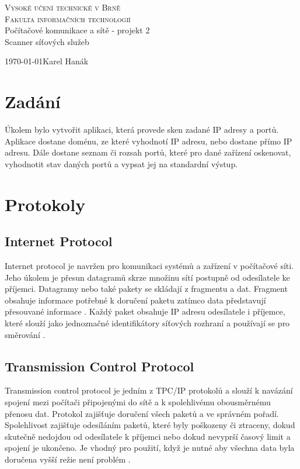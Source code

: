 \documentclass[a4paper, 11pt]{article}
\begin{document}
	\begin{titlepage}
		\begin{center}
			{\Huge \textsc{Vysoké učení technické v Brně\\[0,3em]{\huge Fakulta informačních technologií}}}\\
			{{\Huge Počítačové komunikace a sítě - projekt 2}\\[0,4em]{\Huge Scanner síťových služeb}}\\
		\end{center}
		{\Large \today \hfill Karel Hanák}
	\end{titlepage}
	
	\tableofcontents
	\newpage

\section{Zadání}
Úkolem bylo vytvořit aplikaci, která provede sken zadané IP adresy a portů. Aplikace dostane doménu, ze které vyhodnotí IP adresu, nebo dostane přímo IP adresu. Dále dostane seznam či rozsah portů, které pro dané zařízení oskenovat, vyhodnotit stav daných portů a vypsat jej na standardní výstup.

\section{Protokoly}	
\subsection{Internet Protocol}
Internet protocol je navržen pro komunikaci systémů a zařízení v počítačové síti. Jeho úkolem je přesun datagramů skrze množinu sítí postupně od odesílatele ke příjemci. Datagramy nebo také pakety se skládají z fragmentu a dat.
Fragment obsahuje informace potřebné k doručení paketu zatímco data představují přesouvané informace \cite{iprfc}. Každý paket obsahuje IP adresu odesílatele i příjemce, které slouží jako jednoznačné identifikátory síťových rozhraní a používají se pro směrování \cite{iprotocol}. 

\subsection{Transmission Control Protocol}
Transmission control protocol je jedním z TPC/IP protokolů a slouží k navázání spojení mezi počítači připojenými do sítě a k spolehlivému obousměrnému přenosu dat. Protokol zajišťuje doručení všech paketů a ve správném pořadí. Spolehlivost zajišťuje odesíláním paketů, které byly poškozeny či ztraceny, dokud skutečně nedojdou od odesílatele k příjemci nebo dokud nevyprší časový limit a spojení je ukončeno. Je vhodný pro použití, když je nutné aby všechna data byla doručena vyšší režie není problém \cite{tcprotocol}. 
\end{document}
